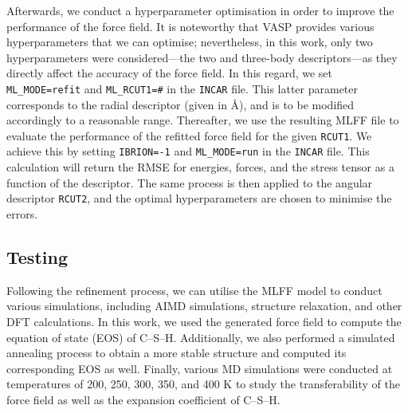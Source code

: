 Afterwards, we conduct a hyperparameter optimisation in order to improve the performance of the force field. It is noteworthy that VASP provides various hyperparameters that we can optimise; nevertheless, in this work, only two hyperparameters were considered---the two and three-body descriptors---as they directly affect the accuracy of the force field. In this regard, we set \texttt{ML\_MODE=refit} and \texttt{ML\_RCUT1=\#} in the \texttt{INCAR} file. This latter parameter corresponds to the radial descriptor (given in \AA), and is to be modified accordingly to a reasonable range. Thereafter, we use the resulting MLFF file to evaluate the performance of the refitted force field for the given \texttt{RCUT1}. We achieve this by setting \texttt{IBRION=-1} and \texttt{ML\_MODE=run} in the \texttt{INCAR} file. This calculation will return the RMSE for energies, forces, and the stress tensor as a function of the descriptor. The same process is then applied to the angular descriptor \texttt{RCUT2}, and the optimal hyperparameters are chosen to minimise the errors. 

\subsection{Testing}
Following the refinement process, we can utilise the MLFF model to conduct various simulations, including AIMD simulations, structure relaxation, and other DFT calculations. In this work, we used the generated force field to compute the equation of state (EOS) of  C--S--H. Additionally, we also performed a simulated annealing process to obtain a more stable structure and computed its corresponding EOS as well. Finally, various MD simulations were conducted at temperatures of 200, 250, 300, 350, and 400 K to study the transferability of the force field as well as the expansion coefficient of  C--S--H.